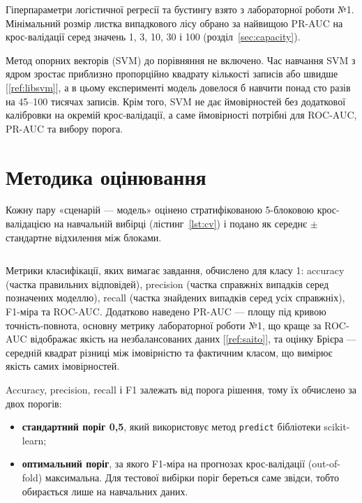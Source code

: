 \documentclass[14pt,a4paper]{extreport}
\begin{document}
Гіперпараметри логістичної регресії та бустингу взято з лабораторної роботи №1. Мінімальний розмір листка випадкового лісу обрано за найвищою PR-AUC на крос-валідації серед значень 1, 3, 10, 30 і 100 (розділ~\ref{sec:capacity}).

Метод опорних векторів (SVM) до порівняння не включено. Час навчання SVM з ядром зростає приблизно пропорційно квадрату кількості записів або швидше [\ref{ref:libsvm}], а в цьому експерименті модель довелося б навчити понад сто разів на 45--100 тисячах записів. Крім того, SVM не дає ймовірностей без додаткової калібровки на окремій крос-валідації, а саме ймовірності потрібні для ROC-AUC, PR-AUC та вибору порога.

\section{Методика оцінювання}
\label{sec:method}

Кожну пару «сценарій --- модель» оцінено стратифікованою 5-блоковою крос-валідацією на навчальній вибірці (лістинг~\ref{lst:cv}) і подано як середнє $\pm$ стандартне відхилення між блоками.

\inputminted[firstline=119,lastline=149]{python}{../src/mk1/comparison.py}
\label{lst:cv}

Метрики класифікації, яких вимагає завдання, обчислено для класу 1: accuracy (частка правильних відповідей), precision (частка справжніх випадків серед позначених моделлю), recall (частка знайдених випадків серед усіх справжніх), F1-міра та ROC-AUC. Додатково наведено PR-AUC --- площу під кривою точність-повнота, основну метрику лабораторної роботи №1, що краще за ROC-AUC відображає якість на незбалансованих даних [\ref{ref:saito}], та оцінку Брієра --- середній квадрат різниці між імовірністю та фактичним класом, що вимірює якість самих імовірностей.

Accuracy, precision, recall і F1 залежать від порога рішення, тому їх обчислено за двох порогів:

\begin{itemize}
\item \textbf{стандартний поріг 0,5}, який використовує метод \texttt{predict} бібліотеки scikit-learn;
\item \textbf{оптимальний поріг}, за якого F1-міра на прогнозах крос-валідації (out-of-fold) максимальна. Для тестової вибірки поріг береться саме звідси, тобто обирається лише на навчальних даних.
\end{itemize}
\end{document}
